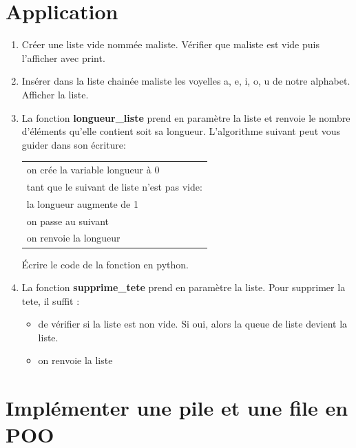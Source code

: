 \documentclass[11pt,a4paper]{article}
\begin{document}
\section{Application}


\begin{enumerate}

\item Créer une liste vide nommée \textsf{maliste}. Vérifier que \textsf{maliste} est vide puis l'afficher avec print.

\item Insérer dans la liste chainée \textsf{maliste} les voyelles \textsf{a, e, i, o, u} de notre alphabet. Afficher la liste.

\item La fonction \textbf{longueur\_liste} prend en paramètre la liste et renvoie le nombre d'éléments qu'elle contient soit sa longueur. 
L'algorithme suivant peut vous guider dans son écriture:

\begin{center}
\begin{tabular}{|L{10cm}|}\hline
on crée la variable longueur à 0\\
tant que le suivant de liste n'est pas vide: \\
\hspace{1cm} la longueur augmente de 1\\
\hspace{1cm} on passe au suivant\\
on renvoie la longueur\\\hline
\end{tabular}
\end{center}

Écrire le code de la fonction en python.

\item La fonction \textbf{supprime\_tete} prend en paramètre la liste. Pour supprimer la tete, il suffit :
\begin{itemize}
\item de vérifier si la liste est non vide. Si oui, alors la  queue de liste devient la liste.
\item on renvoie la liste
\end{itemize}

\end{enumerate}



\newpage
\section{Implémenter une pile et une file en POO}
\end{document}
